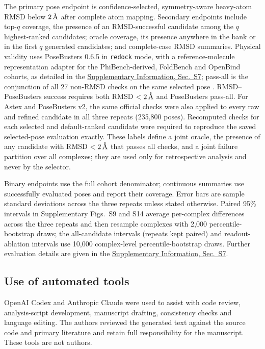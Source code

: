 \documentclass{article}
\newcommand{\angstrom}{\text{\normalfont\AA}}
\newcommand{\citep}[1]{\cite{#1}}
\newcommand{\sisection}[1]{\href{SI.pdf}{Supplementary Information, Sec.~#1}}
\begin{document}
The primary pose endpoint is confidence-selected, symmetry-aware heavy-atom RMSD below \(2\,\angstrom\) after complete atom mapping.
Secondary endpoints include top-\(q\) coverage, the presence of an RMSD-successful candidate among the \(q\) highest-ranked candidates; oracle coverage, its presence anywhere in the bank or in the first \(q\) generated candidates; and complete-case RMSD summaries.
Physical validity uses PoseBusters 0.6.5 in \texttt{redock} mode, with a reference-molecule representation adapter for the PhiBench-derived, FoldBench and OpenBind cohorts, as detailed in the \sisection{S7}; pass-all is the conjunction of all 27 non-RMSD checks on the same selected pose \citep{buttenschoen2024posebusters}.
RMSD--PoseBusters success requires both RMSD \(<2\,\angstrom\) and PoseBusters pass-all.
For Astex and PoseBusters v2, the same official checks were also applied to every raw and refined candidate in all three repeats (235,800 poses). Recomputed checks for each selected and default-ranked candidate were required to reproduce the saved selected-pose evaluation exactly. These labels define a joint oracle, the presence of any candidate with RMSD \(<2\,\angstrom\) that passes all checks, and a joint failure partition over all complexes; they are used only for retrospective analysis and never by the selector.

Binary endpoints use the full cohort denominator; continuous summaries use successfully evaluated poses and report their coverage.
Error bars are sample standard deviations across the three repeats unless stated otherwise.
Paired 95\% intervals in Supplementary Figs.~S9 and S14 average per-complex differences across the three repeats and then resample complexes with 2,000 percentile-bootstrap draws; the all-candidate intervals (repeats kept paired) and readout-ablation intervals use 10,000 complex-level percentile-bootstrap draws.
Further evaluation details are given in the \sisection{S7}.

\subsection{Use of automated tools}

OpenAI Codex and Anthropic Claude were used to assist with code review, analysis-script development, manuscript drafting, consistency checks and language editing.
The authors reviewed the generated text against the source code and primary literature and retain full responsibility for the manuscript.
These tools are not authors.
\end{document}
